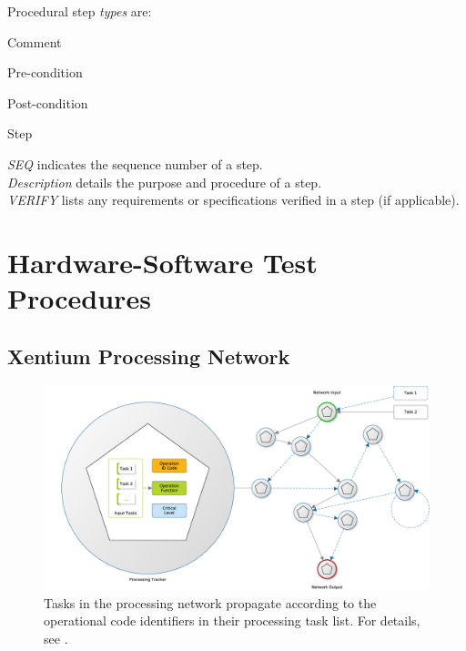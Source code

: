 \noindent
Procedural step \emph{types} are:
\begin{description}[labelwidth=4em,leftmargin=\parindent,labelindent=\parindent]
	\item[\textbf{CMT}]	Comment
	\item[\textbf{PRE}]	Pre-condition
	\item[\textbf{PST}]	Post-condition
	\item[\textbf{STP}]	Step
\end{description}


\noindent
\emph{SEQ} indicates the sequence number of a step.\\

\noindent
\emph{Description} details the purpose and procedure of a step. \\

\noindent
\emph{VERIFY} lists any requirements or specifications verified in a 
step (if applicable).\\

\newpage
\section{Hardware-Software Test Procedures}

\subsection{Xentium Processing Network}

\begin{figure}%
\begin{center}
	\includegraphics[width=1.0\columnwidth]{../usermanual/images/task_network}
	\caption{Tasks in the processing network propagate according to the
		 operational code identifiers in their processing task list.
	 	 For details, see \cite{leanosUM}.}
	\label{fig:task_network}
\end{center}
\end{figure}

